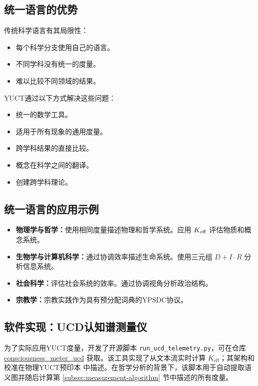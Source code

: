 \documentclass[11pt,a4paper]{article}
\begin{document}
	\subsection{统一语言的优势}
	
	传统科学语言有其局限性：
	\begin{itemize}
		\item 每个科学分支使用自己的语言。
		\item 不同学科没有统一的度量。
		\item 难以比较不同领域的结果。
	\end{itemize}
	
	YUCT通过以下方式解决这些问题：
	\begin{itemize}
		\item 统一的数学工具。
		\item 适用于所有现象的通用度量。
		\item 跨学科结果的直接比较。
		\item 概念在科学之间的翻译。
		\item 创建跨学科理论。
	\end{itemize}
	
	\subsection{统一语言的应用示例}
	
	\begin{itemize}
		\item \textbf{物理学与哲学：}使用相同度量描述物理和哲学系统。应用 \(\Keff\) 评估物质和概念系统。
		\item \textbf{生物学与计算机科学：}通过协调效率描述生命系统。使用三元组 \(D + I \cdot R\) 分析信息系统。
		\item \textbf{社会科学：}评估社会系统的效率。通过协调视角分析政治结构。
		\item \textbf{宗教学：}宗教实践作为具有预分配词典的YPSDC协议。
	\end{itemize}
	
	\subsection{软件实现：UCD认知谱测量仪}
	\label{subsec:ucd-software}
	
	为了实际应用YUCT度量，开发了开源脚本 \texttt{run\_ucd\_telemetry.py}，可在仓库 \href{https://github.com/Alexey-Yakushev-YUCT/consciousness_meter_ucd}{consciousness\_meter\_ucd} 获取。该工具实现了从文本流实时计算 \(K_{\mathrm{eff}}\)；其架构和校准在物理YUCT预印本 \cite{Yakushev2026b} 中描述。在哲学分析的背景下，该脚本用于自动提取语义图并随后计算第 \ref{subsec:measurement-algorithm} 节中描述的所有度量。
	
\end{document}
